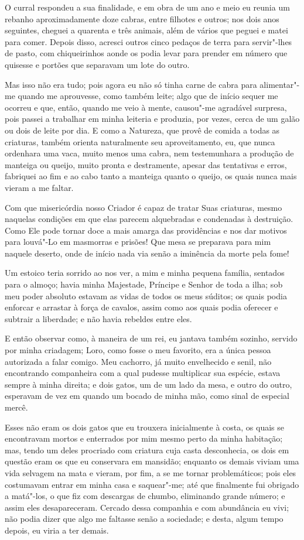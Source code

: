O curral respondeu a sua finalidade, e em obra de um ano e meio eu
reunia um rebanho aproximadamente doze cabras, entre filhotes e outros;
nos dois anos seguintes, cheguei a quarenta e três animais, além de
vários que peguei e matei para comer. Depois disso, acresci outros cinco
pedaços de terra para servir"-lhes de pasto, com chiqueirinhos aonde os
podia levar para prender em número que quisesse e portões que separavam
um lote do outro.

Mas isso não era tudo; pois agora eu não só tinha carne de cabra para
alimentar"-me quando me aprouvesse, como também leite; algo que de início
sequer me ocorreu e que, então, quando me veio à mente, causou"-me
agradável surpresa, pois passei a trabalhar em minha leiteria e
produzia, por vezes, cerca de um galão ou dois de leite por dia. E como
a Natureza, que provê de comida a todas as criaturas, também orienta
naturalmente seu aproveitamento, eu, que nunca ordenhara uma vaca, muito
menos uma cabra, nem testemunhara a produção de manteiga ou queijo,
muito pronta e destramente, apesar das tentativas e erros, fabriquei ao
fim e ao cabo tanto a manteiga quanto o queijo, os quais nunca mais
vieram a me faltar.

Com que misericórdia nosso Criador é capaz de tratar Suas criaturas,
mesmo naquelas condições em que elas parecem alquebradas e condenadas à
destruição. Como Ele pode tornar doce a mais amarga das providências e
nos dar motivos para louvá"-Lo em masmorras e prisões! Que mesa se
preparava para mim naquele deserto, onde de início nada via senão a
iminência da morte pela fome!

Um estoico teria sorrido ao nos ver, a mim e minha pequena família,
sentados para o almoço; havia minha Majestade, Príncipe e Senhor de toda
a ilha; sob meu poder absoluto estavam as vidas de todos os meus
súditos; os quais podia enforcar e arrastar à força de cavalos, assim
como aos quais podia oferecer e subtrair a liberdade; e não havia
rebeldes entre eles.

E então observar como, à maneira de um rei, eu jantava também sozinho,
servido por minha criadagem; Loro, como fosse o meu favorito, era a
única pessoa autorizada a falar comigo. Meu cachorro, já muito
envelhecido e senil, não encontrando companheira com a qual pudesse
multiplicar sua espécie, estava sempre à minha direita; e dois gatos, um
de um lado da mesa, e outro do outro, esperavam de vez em quando um
bocado de minha mão, como sinal de especial mercê.

Esses não eram os dois gatos que eu trouxera inicialmente à costa, os
quais se encontravam mortos e enterrados por mim mesmo perto da minha
habitação; mas, tendo um deles procriado com criatura cuja casta
desconhecia, os dois em questão eram os que eu conservara em mansidão;
enquanto os demais viviam uma vida selvagem na mata e vieram, por fim, a
se me tornar problemáticos; pois eles costumavam entrar em minha casa e
saquear"-me; até que finalmente fui obrigado a matá"-los, o que fiz com
descargas de chumbo, eliminando grande número; e assim eles
desapareceram. Cercado dessa companhia e com abundância eu vivi; não
podia dizer que algo me faltasse senão a sociedade; e desta, algum tempo
depois, eu viria a ter demais.

